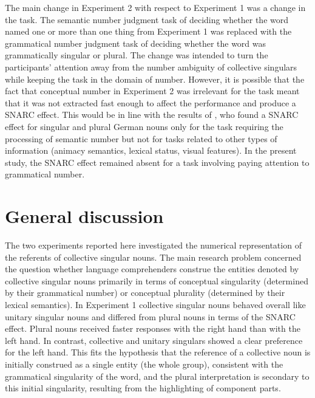 \documentclass[output=paper]{langscibook}
\begin{document}
The main change in Experiment 2 with respect to Experiment 1 was a change in the task. The semantic number judgment task of deciding whether the word named one or more than one thing from Experiment 1 was replaced with the grammatical number judgment task of deciding whether the word was grammatically singular or plural. The change was intended to turn the participants’ attention away from the number ambiguity of collective singulars while keeping the task in the domain of number. However, it is possible that the fact that conceptual number in Experiment 2 was irrelevant for the task meant that it was not extracted fast enough to affect the performance and produce a SNARC effect. This would be in line with the results of \citet{rottgerGrammaticalNumberElicits2015}, who found a SNARC effect for singular and plural German nouns only for the task requiring the processing of semantic number but not for tasks related to other types of information (animacy semantics, lexical status, visual features). In the present study, the SNARC effect remained absent for a task involving paying attention to grammatical number.

\section{General discussion}
The two experiments reported here investigated the numerical representation of the referents of collective singular nouns. The main research problem concerned the question whether language comprehenders construe the entities denoted by collective singular nouns primarily in terms of conceptual singularity (determined by their grammatical number) or conceptual plurality (determined by their lexical semantics). In Experiment 1 collective singular nouns behaved overall like unitary singular nouns and differed from plural nouns in terms of the SNARC effect. Plural nouns received faster responses with the right hand than with the left hand. In contrast, collective and unitary singulars showed a clear preference for the left hand. This fits the hypothesis that the reference of a collective noun is initially construed as a single entity (the whole group), consistent with the grammatical singularity of the word, and the plural interpretation is secondary to this initial singularity, resulting from the highlighting of component parts. 
\end{document}
